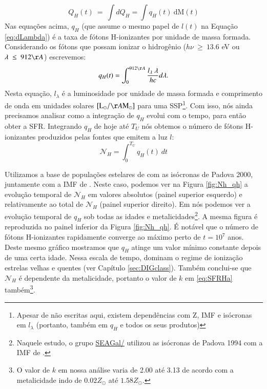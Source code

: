 \begin{equation}
	Q_H(t)\ =\ \int dQ_H = \int q_H(t)\ \mathrm{d}\mathrm{M}(t)
	\label{eq:QH_t}
\end{equation}
\noindent Nas equações acima, $q_H$ (que assume o mesmo papel de $l(t)$ na Equação \ref{eq:dLambda}) é a taxa de fótons H-ionizantes por unidade de massa formada. Considerando os fótons que possam ionizar o hidrogênio ($h\nu\ \geq\ 13.6$ eV ou $\lambda\ \leq\ 912\AA$) escrevemos:
\begin{equation}
	q_H(t) = \int_0^{912\AA} \frac{l_\lambda\ \lambda}{h c} d\lambda.
	\label{eq:qH}
\end{equation}
\noindent Nesta equação, $l_\lambda$ é a luminosidade por unidade de massa formada e comprimento de onda em unidades solares $[\textrm{L}_\odot/\AA\textrm{M}_\odot]$ para uma SSP\footnote{Apesar de não escritas aqui, existem dependências com Z, IMF e isócronas em $l_\lambda$ (portanto, também em $q_H$ e todos os seus produtos)}. Com isso, nós ainda precisamos analisar como a integração de $q_H$ evolui com o tempo, para então obter a SFR. Integrando $q_H$ de hoje até $T_U$ nós obtemos o número de fótons H-ionizantes produzidos pelas fontes que emitem a luz $l$:
\begin{equation}
	\mathcal{N}_H = \int_0^{T_U} q_H(t)\ dt
	\label{eq:Nh}
\end{equation}

Utilizamos a base de populações estelares de \citet{Bruzual.Charlot.2003} com as isócronas de Padova 2000, juntamente com a IMF de \citet{Salpeter.1955a}. Neste caso, podemos ver na Figura \ref{fig:Nh_qh} a evolução temporal de $\mathcal{N}_H$ em valores absolutos (painel superior esquerdo) e relativamente ao total de $\mathcal{N}_H$ (painel superior direito). Em \citet[Figura 2b]{CidFernandes.etal.2011a} nós podemos ver a evolução temporal de $q_H$ sob todas as idades e metalicidades\footnote{Naquele estudo, o grupo \href{http://starlight.ufsc.br}{SEAGal/\STARLIGHT} utilizou as isócronas de Padova 1994 com a IMF de \citet{Chabrier.2003a}.}. A mesma figura é reproduzida no painel inferior da Figura \ref{fig:Nh_qh}. É notável que o número de fótons H-ionizantes rapidamente converge ao máximo perto de $t = 10^7$ anos. Deste mesmo gráfico mostramos que $q_H$ atinge um valor mínimo constante depois de uma certa idade. Nessa escala de tempo, dominam o regime de ionização estrelas velhas e quentes (ver Capítulo \ref{sec:DIGclass}). Também conclui-se que $\mathcal{N}_H$ é dependente da metalicidade, portanto o valor de $k$ em \eqref{eq:SFRHa} também\footnote{O valor de $k$ em nossa análise varia de 2.00 até 3.13 de acordo com a metalicidade indo de $0.02 Z_\odot$ até $1.58 Z_\odot$.}.

